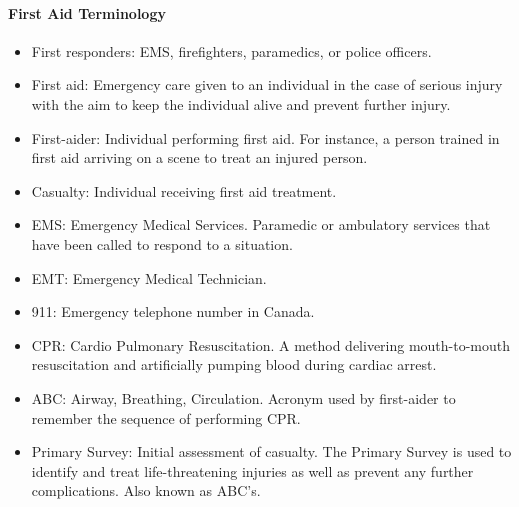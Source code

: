 \documentclass{article}
\begin{document}
	\paragraph{First Aid Terminology}
	\begin{itemize}
	    \item First responders: EMS, firefighters, paramedics, or police officers.
	    \item First aid:  Emergency care given to an individual in the case of serious injury with the aim to keep the individual alive and prevent further injury.
	    \item First-aider: Individual performing first aid.  For instance, a person trained in first aid arriving on a scene to treat an injured person.
	     \item Casualty: Individual receiving first aid treatment.
	    \item EMS: Emergency Medical Services.  Paramedic or ambulatory services that have been called to respond to a situation. 
	    \item EMT:  Emergency Medical Technician.
	    \item 911:  Emergency telephone number in Canada.
	    \item CPR:  Cardio Pulmonary Resuscitation.  A method delivering mouth-to-mouth resuscitation and artificially pumping blood during cardiac arrest.
	    \item ABC:  Airway, Breathing, Circulation.  Acronym used by first-aider to remember the sequence of performing CPR.
	    \item Primary Survey:  Initial assessment of casualty.  The Primary Survey is used to identify and treat life-threatening injuries as well as prevent any further complications. Also known as ABC's.
    \end{itemize}
    
\end{document}
